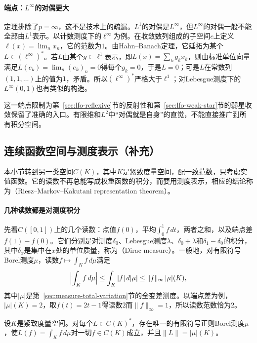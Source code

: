 \paragraph{端点：$L^\infty$的对偶更大}
定理排除了$p=\infty$，这不是技术上的疏漏。$L^1$的对偶是$L^\infty$，但$L^\infty$的对偶一般不能全部由$L^1$表示。以计数测度下的$\ell^\infty$为例。在收敛数列组成的子空间$c$上定义$\ell(x)=\lim_nx_n$，它的范数为$1$。由Hahn--Banach定理，它延拓为某个$L\in(\ell^\infty)^*$。若$L$由某个$g\in\ell^1$表示，即$L(x)=\sum_kg_kx_k$，则由标准单位向量满足$L(e_k)=\lim_n(e_k)_n=0$得每个$g_k=0$，于是$L=0$；可是$L$在常数列$(1,1,\ldots)$上的值为$1$，矛盾。所以$(\ell^\infty)^*$严格大于$\ell^1$；对Lebesgue测度下的$L^\infty(0,1)$也有类似的构造。

这一端点限制为第~\ref{sec:lfo-reflexive}节的反射性和第~\ref{sec:lfo-weak-star}节的弱星收敛保留了准确的入口。有限维和$L^2$中“对偶就是自身”的直觉，不能直接推广到所有积分空间。

\subsection{连续函数空间与测度表示（补充）}
\label{sec:lfo-ck-dual}

本小节转到另一类空间$C(K)$，其中$K$是紧致度量空间，配一致范数，只考虑实值函数。它的读数不再总能写成权重函数的积分，而要用测度表示，相应的结论称为（Riesz--Markov--Kakutani representation theorem）。

\paragraph{几种读数都是对测度积分}
先看$C([0,1])$上的几个读数：点值$f(0)$，平均$\int_0^1f\,dt$，两者之和，以及端点差$f(1)-f(0)$。它们分别是对测度$\delta_0$、Lebesgue测度$\lambda$、$\delta_0+\lambda$和$\delta_1-\delta_0$的积分，其中$\delta_x$是集中在$x$处的单位质量，称为（Dirac measure）。一般地，对有限符号Borel测度$\mu$，读数$f\mapsto\int_Kf\,d\mu$满足
\[
 \Bigl|\int_Kf\,d\mu\Bigr|\leq\int_K|f|\,d|\mu|\leq\|f\|_\infty\,|\mu|(K),
\]
其中$|\mu|$是第~\ref{sec:measure-total-variation}节的全变差测度。以端点差为例，$|\mu|(K)=2$，取$f(t)=2t-1$得读数$2$而$\|f\|_\infty=1$，所以读数范数恰为$2$。

\begin{theorem}
\label{thm:lfo-ck-dual}
设$K$是紧致度量空间。对每个$L\in C(K)^*$，存在唯一的有限符号正则Borel测度$\mu$，使$L(f)=\int_Kf\,d\mu$对一切$f\in C(K)$成立，并且$\|L\|=|\mu|(K)$。
\end{theorem}

